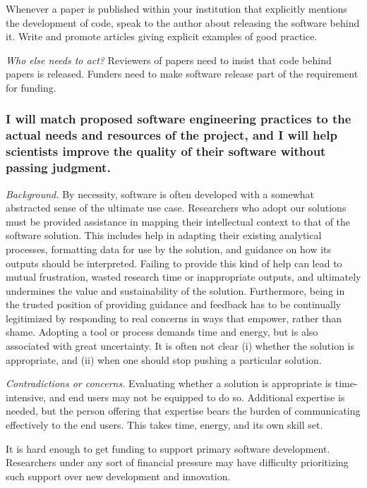 \documentclass[a4paper,UKenglish]{dagman}
\renewcommand{\paragraph}[1]{\subsubsection*{#1}\xspace}
\begin{document}
Whenever a paper is published within your institution that explicitly mentions the development of code, speak to the author about releasing the software behind it. Write and promote articles giving explicit examples of good practice.



\emph{Who else needs to act?}
Reviewers of papers need to insist that code behind papers is released. Funders need to make software release part of the requirement for funding.

\paragraph{I will match proposed software engineering practices to the actual needs and resources of the project, and I will help scientists improve the quality of their software without passing judgment.}


\emph{Background.}
By necessity, software is often developed with a somewhat abstracted sense of the ultimate use case. Researchers who adopt our solutions must be provided assistance in mapping their intellectual context to that of the software solution. This includes help in adapting their existing analytical processes, formatting data for use by the solution, and guidance on how its outputs should be interpreted. Failing to provide this kind of help can lead to mutual frustration, wasted research time or inappropriate outputs, and ultimately undermines the value and sustainability of the solution. Furthermore, being in the trusted position of providing guidance and feedback has to be continually legitimized by responding to real concerns in ways that empower, rather than shame. Adopting a tool or process demands time and energy, but is also associated with great uncertainty. It is often not clear (i) whether the solution is appropriate, and (ii) when one should stop pushing a particular solution.

\emph{Contradictions or concerns.}
Evaluating whether a solution is appropriate is time-intensive, and end users may not be equipped to do so. Additional expertise is needed, but the person offering that expertise bears the burden of communicating effectively to the end users. This takes time, energy, and its own skill set.

It is hard enough to get funding to support primary software development. Researchers under any sort of financial pressure may have difficulty prioritizing such support over new development and innovation. 
\end{document}
